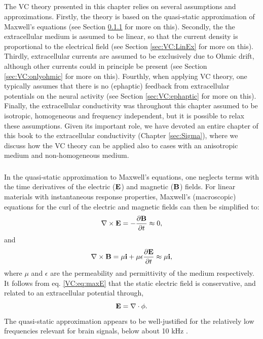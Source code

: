 \subsection{}
\label{sec:VC:approximations}
The VC theory presented in this chapter relies on several assumptions and approximations. Firstly, the theory is based on the quasi-static approximation of Maxwell's equations (see Section \ref{sec:VC:quasistatic} for more on this). Secondly, the the extracellular medium is assumed to be linear, so that the current density is proportional to the electrical field (see Section \ref{sec:VC:LinEx} for more on this). Thirdly, extracellular currents are assumed to be exclusively due to Ohmic drift, although other currents could in principle be present (see Section \ref{sec:VC:onlyohmic} for more on this). Fourthly, when applying VC theory, one typically assumes that there is no (ephaptic) feedback from extracellular potentials on the neural activity (see Section \ref{sec:VC:ephaptic} for more on this). Finally, the extracellular conductivity was throughout this chapter assumed to be isotropic, homogeneous and frequency independent, but it is possible to relax these assumptions. Given its important role, we have devoted an entire chapter of this book to the extracellular conductivity (Chapter \ref{sec:Sigma}), where we discuss how the VC theory can be applied also to cases with an anisotropic medium and non-homogeneous medium.

\subsubsection{}
\label{sec:VC:quasistatic}
In the quasi-static approximation to Maxwell's equations, one neglects terms with the time derivatives of the electric (${\bf E}$) and magnetic (${\bf B}$) fields. For linear materials with instantaneous response properties, Maxwell's (macroscopic) equations for the curl of the electric and magnetic fields can then be simplified to:
\begin{equation}
\nabla \times {\bf E} = - \frac{\partial {\bf B}}{\partial t}  \approx 0, 
\label{VC:eq:maxE}
\end{equation}
and
\begin{equation}
\nabla \times {\bf B} = \mu{\bf i} + \mu \epsilon \frac{\partial {\bf E}}{\partial t} \approx  \mu {\bf i} ,
\label{VC:eq:maxB}
\end{equation}
where $\mu$ and $\epsilon$ are the permeability and permittivity of the medium respectively. It follows from eq. \ref{VC:eq:maxE} that the static electric field is conservative, and related to an extracellular potential through,
\begin{equation}
{\bf E} = \nabla \cdot \phi.
\label{VC:eq:conservative}
\end{equation}
The quasi-static approximation appears to be well-justified for the relatively low frequencies relevant for brain signals, below about 10 kHz \citep{Nunez2006, Grodzinsky2011}.


